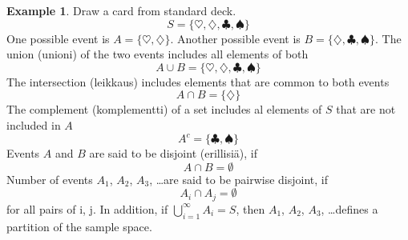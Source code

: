 \documentclass[10pt, twoside, a4paper]{book}
\theoremstyle{definition}
\newtheorem{example}{Example}[chapter]
\begin{document}
\begin{example}
Draw a card from standard deck.
$$S = \{ \heartsuit , \diamondsuit , \clubsuit, \spadesuit \}$$
One possible event is $A = \{ \heartsuit , \diamondsuit\}$.
Another possible event is $B = \{ \diamondsuit , \clubsuit, \spadesuit \}$. The
union (unioni) of the two events includes all elements of both
$$A \cup B = \{ \heartsuit , \diamondsuit , \clubsuit, \spadesuit \}$$
The intersection (leikkaus) includes elements that are common to both events
$$A \cap B = \{ \diamondsuit \}$$
The complement (komplementti) of a set includes al elements of $S$ that are not
included in $A$
$$A^c = \{ \clubsuit, \spadesuit \}$$
Events $A$ and $B$ are said to be disjoint (erillisi\"a), if 
$$A \cap B = \emptyset$$
Number of events $A_1$, $A_2$, $A_3$, \ldots are said to be pairwise disjoint,
if
$$A_i \cap A_j = \emptyset$$
for all pairs of i, j. In addition, if $\bigcup_{i=1}^{\infty}A_i = S$,
then $A_1$, $A_2$, $A_3$, \ldots defines a partition of the sample space.

\end{example}
\end{document}

